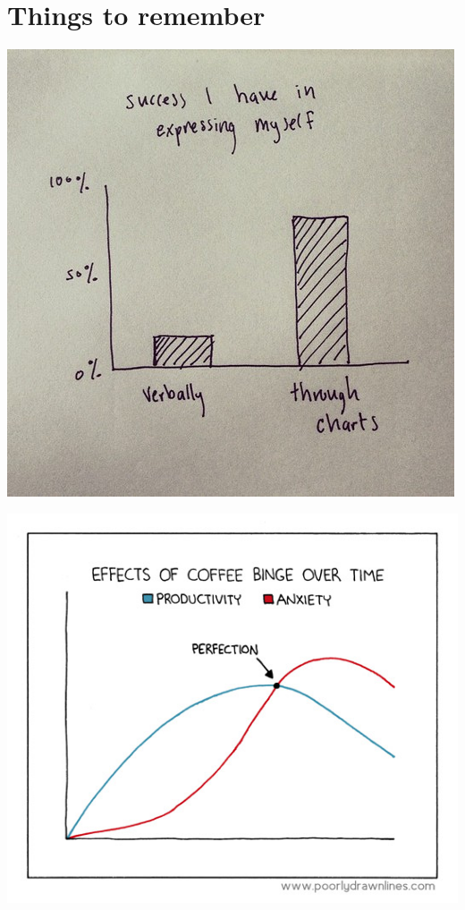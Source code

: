 \documentclass{beamer}
\begin{document}
\section{Things to remember}
\begin{frame}
  \begin{center}
    \includegraphics[height = \textheight, keepaspectratio = true]{figure/success}
  \end{center}
\end{frame}

\begin{frame}
  \begin{center}
    \includegraphics[height = 0.8\textheight, keepaspectratio = true]{figure/coffee-binge}
  \end{center}
\end{frame}
\end{document}
